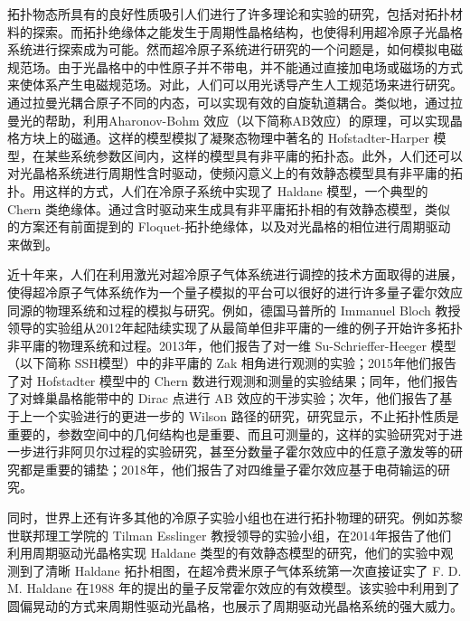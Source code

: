 拓扑物态所具有的良好性质吸引人们进行了许多理论和实验的研究，包括对拓扑材料的探索。而拓扑绝缘体之能发生于周期性晶格结构，也使得利用超冷原子光晶格系统进行探索成为可能。然而超冷原子系统进行研究的一个问题是，如何模拟电磁规范场。由于光晶格中的中性原子并不带电，并不能通过直接加电场或磁场的方式来使体系产生电磁规范场。对此，人们可以用光诱导产生人工规范场\cite{lightgauge2014}来进行研究。通过拉曼光耦合原子不同的内态，可以实现有效的自旋轨道耦合。类似地，通过拉曼光的帮助，利用Aharonov-Bohm 效应（以下简称AB效应）的原理，可以实现晶格方块上的磁通\cite{harper1,harper2}。这样的模型模拟了凝聚态物理中著名的 Hofstadter-Harper 模型\cite{topobook}，在某些系统参数区间内，这样的模型具有非平庸的拓扑态\cite{topobook}。此外，人们还可以对光晶格系统进行周期性含时驱动，使频闪意义上的有效静态模型具有非平庸的拓扑。用这样的方式，人们在冷原子系统中实现了 Haldane 模型\cite{haldane-expr-2014}，一个典型的 Chern 类绝缘体。通过含时驱动来生成具有非平庸拓扑相的有效静态模型，类似的方案还有前面提到的 Floquet-拓扑绝缘体\cite{floq-ti-2011}，以及对光晶格的相位进行周期驱动来做到\cite{zhengwei-floquet-2014}。

近十年来，人们在利用激光对超冷原子气体系统进行调控的技术方面取得的进展，使得超冷原子气体系统作为一个量子模拟的平台可以很好的进行许多量子霍尔效应同源的物理系统和过程的模拟与研究\cite{topo2016zoller}。例如，德国马普所的 Immanuel Bloch 教授领导的实验组从2012年起陆续实现了从最简单但非平庸的一维的例子开始许多拓扑非平庸的物理系统和过程。2013年，他们报告了对一维 Su-Schrieffer-Heeger 模型（以下简称 SSH模型）\cite{ssh1979}中的非平庸的 Zak 相角\cite{zak1989}进行观测的实验\cite{zak-expr-2013}；2015年他们报告了对 Hofstadter 模型中的 Chern 数\cite{chern-expr-2015}进行观测和测量的实验结果；同年，他们报告了对蜂巢晶格能带中的 Dirac 点进行 AB 效应的干涉实验\cite{ab-expr-2015}；次年，他们报告了基于上一个实验进行的更进一步的 Wilson 路径的研究\cite{wilsonline-expr-2016}，研究显示，不止拓扑性质是重要的，参数空间中的几何结构也是重要、而且可测量的，这样的实验研究对于进一步进行非阿贝尔过程的实验研究，甚至分数量子霍尔效应中的任意子激发等的研究都是重要的铺垫；2018年，他们报告了对四维量子霍尔效应基于电荷输运的研究\cite{4dqhall-expr-2018}。

同时，世界上还有许多其他的冷原子实验小组也在进行拓扑物理的研究。例如苏黎世联邦理工学院的 Tilman Esslinger 教授领导的实验小组，在2014年报告了他们利用周期驱动光晶格实现 Haldane 类型的有效静态模型的研究\cite{haldane-expr-2014}，他们的实验中观测到了清晰 Haldane 拓扑相图，在超冷费米原子气体系统第一次直接证实了 F. D. M. Haldane 在1988 年的提出的量子反常霍尔效应的有效模型\cite{haldane1988}。该实验中利用到了圆偏晃动的方式来周期性驱动光晶格\cite{oka2009}，也展示了周期驱动光晶格系统的强大威力。


